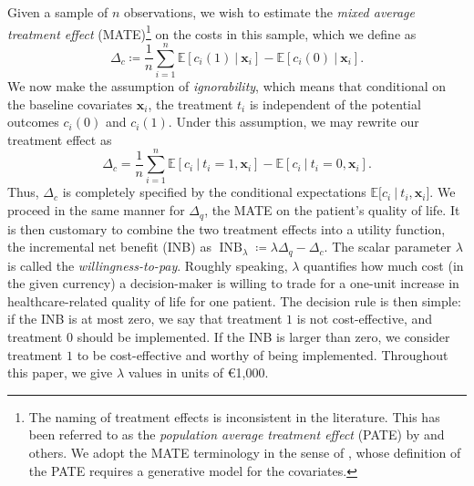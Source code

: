 \documentclass[aoas,preprint]{imsart}
\newcommand\given[1][]{\:#1\vert\:}
\theoremstyle{plain}
\theoremstyle{definition}
\theoremstyle{remark}
\begin{document}
Given a sample of $n$ observations, we wish to estimate the \textit{mixed average treatment effect} (MATE)\footnote{The naming of treatment effects is inconsistent in the literature. This has been referred to as the \textit{population average treatment effect} (PATE) by \citet{imbens2015pate} and others. We adopt the MATE terminology in the sense of \citet{li2023bayesian}, whose definition of the PATE requires a generative model for the covariates.}
on the costs in this sample, which we define as 
\begin{equation}\Delta_c \coloneqq \frac{1}{n} \sum^n_{i = 1} \mathbb{E}\left\lbrack c_i(1)\given \mathbf{x}_i\right\rbrack -  \mathbb{E}\left\lbrack c_i(0)\given \mathbf{x}_i\right\rbrack.\label{eq:li_MATE}
\end{equation}
We now make the assumption of \textit{ignorability}, which means that conditional on the baseline covariates $\mathbf{x}_i$, the treatment $t_i$ is independent of the potential outcomes $c_i(0)$ and $c_i(1)$. Under this assumption, we may rewrite our treatment effect as 
\[\Delta_c = \frac{1}{n} \sum^n_{i = 1} \mathbb{E}\left\lbrack c_i\given t_i = 1, \mathbf{x}_i\right\rbrack -  \mathbb{E}\left\lbrack c_i\given t_i = 0, \mathbf{x}_i\right\rbrack.\]
Thus, $\Delta_c$ is completely specified by the conditional expectations $\mathbb{E}\lbrack c_i\given t_i, \mathbf{x}_i\rbrack$. 
We proceed in the same manner for $\Delta_q$, the MATE on the patient's quality of life. It is then customary to combine the two treatment effects into a utility function, the incremental net benefit (INB) as
$\operatorname{INB}_{\lambda} \coloneqq \lambda \Delta_q - \Delta_c.$
The scalar parameter $\lambda$ is called the \textit{willingness-to-pay}. Roughly speaking, $\lambda$ quantifies how much cost (in the given currency) a decision-maker is willing to trade for a one-unit increase in healthcare-related quality of life for one patient. The decision rule is then simple: if the INB is at most zero, we say that treatment $1$ is not cost-effective, and treatment $0$ should be implemented. If the INB is larger than zero, we consider treatment $1$ to be cost-effective and worthy of being implemented. Throughout this paper, we give $\lambda$ values in units of €1,000.
\end{document}
